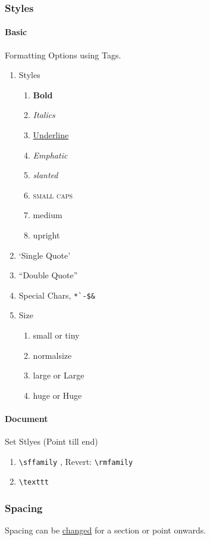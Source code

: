 \documentclass{report}[a4paper,12pt] %
\begin{document}
\subsubsection{Styles}
\paragraph{Basic} Formatting Options using Tags.
\begin{enumerate}
  \item Styles
  \begin{enumerate}
    \item \textbf{Bold}
    \item \textit{Italics}
    \item \underline{Underline}
    \item \emph{Emphatic}
    \item \textsl{slanted}
    \item \textsc{small caps}
    \item \textmd{medium}
    \item \textup{upright}
  \end{enumerate}
  \item `Single Quote'
  \item ``Double Quote''
  \item Special Chars, \verb|*`-$&|
  \item Size
  \begin{enumerate}
    \item \small small or \tiny tiny
    \item \normalsize normalsize
    \item \large large or \Large Large
    \item \huge huge or \Huge Huge
  \end{enumerate}
\end{enumerate}

\paragraph{Document} Set Stlyes (Point till end)
\begin{enumerate}
  \item \verb|\sffamily| , Revert: \verb|\rmfamily|
  \item \verb|\texttt| 
\end{enumerate}

\subsubsection{Spacing} 
Spacing can be \href{https://www.overleaf.com/learn/latex/Articles/How_to_change_paragraph_spacing_in_LaTeX}{changed} for a section or point onwards.
\end{document}
